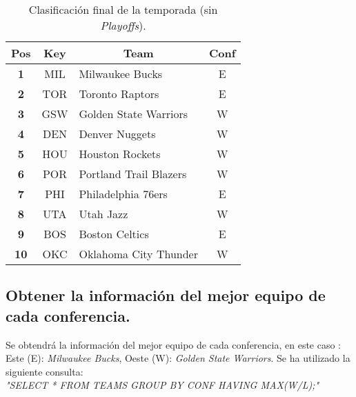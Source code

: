 \documentclass[11pt]{diazessay} %
\begin{document}
\begin{table}[!h]
	\centering
	\begin{tabular}{|c|c|l|c|}
		\hline
		\textbf{Pos} & \textbf{Key} & \multicolumn{1}{c|}{\textbf{Team}} & \textbf{Conf} \\ \hline
		\textbf{1}   & MIL          & Milwaukee Bucks                    & E             \\ \hline
		\textbf{2}   & TOR          & Toronto Raptors                    & E             \\ \hline
		\textbf{3}   & GSW          & Golden State Warriors              & W             \\ \hline
		\textbf{4}   & DEN          & Denver Nuggets                     & W             \\ \hline
		\textbf{5}   & HOU          & Houston Rockets                    & W             \\ \hline
		\textbf{6}   & POR          & Portland Trail Blazers             & W             \\ \hline
		\textbf{7}   & PHI          & Philadelphia 76ers                 & E             \\ \hline
		\textbf{8}   & UTA          & Utah Jazz                          & W             \\ \hline
		\textbf{9}   & BOS          & Boston Celtics                     & E             \\ \hline
		\textbf{10}  & OKC          & Oklahoma City Thunder              & W             \\ \hline
	\end{tabular}
	\caption{Clasificación final de la temporada (sin \textit{Playoffs}).}
	\label{qualy}
\end{table}

\subsection{Obtener la información del mejor equipo de cada conferencia.}
Se obtendrá la información del mejor equipo de cada conferencia, en este caso : Este (E): \textit{Milwaukee Bucks}, Oeste (W):
\textit{Golden State Warriors}. 
Se ha utilizado la siguiente consulta:\\
 
\textit{"SELECT * FROM TEAMS GROUP BY CONF HAVING MAX(W/L);"}
\end{document}
